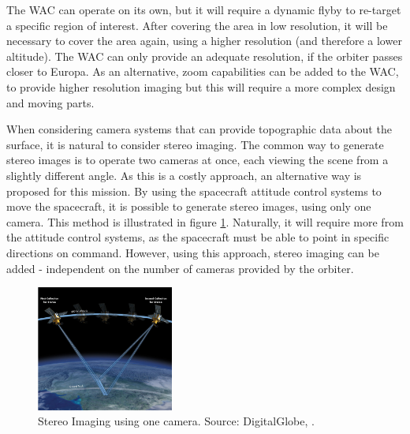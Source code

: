The WAC can operate on its own, but it will require a dynamic flyby to re-target a specific region of interest. After covering the area in low resolution, it will be necessary to cover the area again, using a higher resolution (and therefore a lower altitude). The WAC can only provide an adequate resolution, if the orbiter passes closer to Europa. As an alternative, zoom capabilities can be added to the WAC, to provide higher resolution imaging but this will require a more complex design and moving parts.

When considering camera systems that can provide topographic data about the surface, it is natural to consider stereo imaging. The common way to generate stereo images is to operate two cameras at once, each viewing the scene from a slightly different angle. As this is a costly approach, an alternative way is proposed for this mission. By using the spacecraft attitude control systems to move the spacecraft, it is possible to generate stereo images, using only one camera. This method is illustrated in figure \ref{fig:stereoimg}. Naturally, it will require more from the attitude control systems, as the spacecraft must be able to point in specific directions on command. However, using this approach, stereo imaging can be added - independent on the number of cameras provided by the orbiter.

\begin{figure}[htb!]
\centering
\includegraphics[width=0.4\textwidth]{figures/Orbiter/Stereo_Satellite.png}
\caption{Stereo Imaging using one camera. Source: DigitalGlobe, \cite{satimgcorp2015}.}
\label{fig:stereoimg}
\end{figure}

